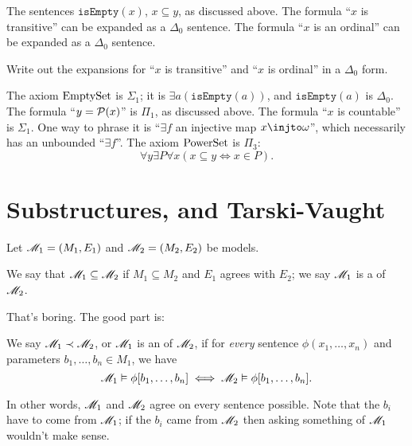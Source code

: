\begin{example}
	\listhack
	\begin{enumerate}[(a)]
		\ii The sentences $\mathtt{isEmpty}(x)$, $x \subseteq y$, as discussed above.
		\ii The formula ``$x$ is transitive'' can be expanded as a $\Delta_0$ sentence.
		\ii The formula ``$x$ is an ordinal'' can be expanded as a $\Delta_0$ sentence.
	\end{enumerate}
\end{example}
\begin{exercise}
	Write out the expansions for ``$x$ is transitive'' and ``$x$ is ordinal''
	in a $\Delta_0$ form.
\end{exercise}
\begin{example}
	\listhack
	\begin{enumerate}[(a)]
		\ii The axiom $\mathrm{EmptySet}$ is $\Sigma_1$; it is $\exists a (\mathtt{isEmpty}(a))$,
		and $\mathtt{isEmpty}(a)$ is $\Delta_0$.
		\ii The formula ``$y = \mathcal P(x)$'' is $\Pi_1$, as discussed above.
		\ii The formula ``$x$ is countable'' is $\Sigma_1$.
		One way to phrase it is ``$\exists f$ an injective map $x \injto \omega$'',
		which necessarily has an unbounded ``$\exists f$''.
		\ii The axiom $\mathrm{PowerSet}$ is $\Pi_3$:
		\[ \forall y \exists P \forall x (x\subseteq y \iff x \in P). \]
	\end{enumerate}
\end{example}

\section{Substructures, and Tarski-Vaught}
Let $\mathscr M_1 = (M_1, E_1)$ and $\mathscr M_2 = (M_2, E_2)$ be models.
\begin{definition}
	We say that $\mathscr M_1 \subseteq \mathscr M_2$ if $M_1 \subseteq M_2$ and
	$E_1$ agrees with $E_2$; we say $\mathscr M_1$ is a  of $\mathscr M_2$.
\end{definition}

That's boring. The good part is:
\begin{definition}
	We say $\mathscr M_1 \prec \mathscr M_2$, or $\mathscr M_1$ is an  of $\mathscr M_2$,
	if for \emph{every} sentence $\phi(x_1, \dots, x_n)$
	and parameters $b_1, \dots, b_n \in M_1$, we have
	\[
		\mathscr M_1 \vDash \phi[b_1, \dots, b_n] \iff
		\mathscr M_2 \vDash \phi[b_1, \dots, b_n].
	\]
\end{definition}
In other words, $\mathscr M_1$ and $\mathscr M_2$ agree on every sentence possible.
Note that the $b_i$ have to come from $\mathscr M_1$; if the $b_i$ came from $\mathscr M_2$ then
asking something of $\mathscr M_1$ wouldn't make sense.


